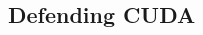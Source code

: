 \documentclass[letterpaper,10pt]{article}
\begin{document}
\begin{multicols}{2}

\section{Defending CUDA}


\end{multicols}
\end{document}

